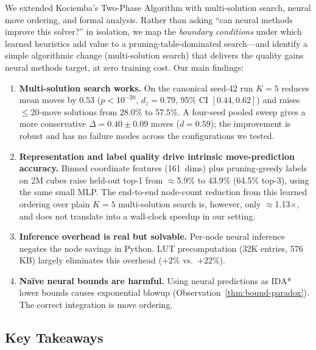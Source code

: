 \documentclass[graybox]{svmult}
\begin{document}
We extended Kociemba's Two-Phase Algorithm with multi-solution search, neural move ordering, and formal analysis. Rather than asking ``can neural methods improve this solver?'' in isolation, we map the \emph{boundary conditions} under which learned heuristics add value to a pruning-table-dominated search---and identify a simple algorithmic change (multi-solution search) that delivers the quality gains neural methods target, at zero training cost. Our main findings:

\begin{enumerate}[leftmargin=*]
  \item \textbf{Multi-solution search works.} On the canonical seed-42 run $K{=}5$ reduces mean moves by $0.53$ ($p < 10^{-20}$, $d_z = 0.79$, 95\% CI $[0.44, 0.62]$) and raises $\leq$20-move solutions from 28.0\% to 57.5\%. A four-seed pooled sweep gives a more conservative $\Delta = 0.40 \pm 0.09$ moves ($d = 0.59$); the improvement is robust and has no failure modes across the configurations we tested.
  \item \textbf{Representation and label quality drive intrinsic move-prediction accuracy.} Binned coordinate features (161~dims) plus pruning-greedy labels on 2M cubes raise held-out top-1 from $\approx$5.9\% to 43.9\% (64.5\% top-3), using the same small MLP. The end-to-end node-count reduction from this learned ordering over plain $K{=}5$ multi-solution search is, however, only $\approx$1.13$\times$, and does not translate into a wall-clock speedup in our setting.
  \item \textbf{Inference overhead is real but solvable.} Per-node neural inference negates the node savings in Python. LUT precomputation (32K entries, 576\,KB) largely eliminates this overhead ($+2\%$ vs.\ $+22\%$).
  \item \textbf{Na\"ive neural bounds are harmful.} Using neural predictions as IDA* lower bounds causes exponential blowup (Observation~\ref{thm:bound-paradox}). The correct integration is move ordering.
\end{enumerate}

\subsection*{Key Takeaways}
\end{document}
